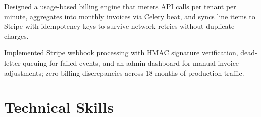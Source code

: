 \begin{rlist}
  \item Designed a usage-based billing engine that meters API calls per tenant per minute, aggregates into monthly invoices via Celery beat, and syncs line items to Stripe with idempotency keys to survive network retries without duplicate charges.
  \item Implemented Stripe webhook processing with HMAC signature verification, dead-letter queuing for failed events, and an admin dashboard for manual invoice adjustments; zero billing discrepancies across 18 months of production traffic.
\end{rlist}

\section{Technical Skills}

